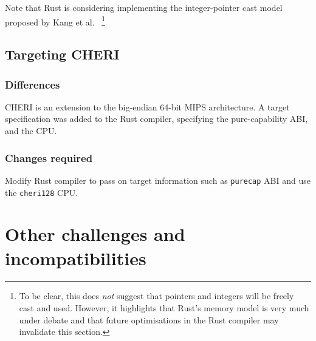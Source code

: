 \documentclass[dissertation.tex]{subfiles}
\begin{document}
Note that Rust is considering implementing the integer-pointer cast
model proposed by Kang et
al.~\cite{kang-intptrcast,rust-miri-intptrcast}
\footnote{To be clear, this does \emph{not} suggest that pointers and
integers will be freely cast and used. However, it highlights that
Rust's memory model is very much under debate and that future
optimisations in the Rust compiler may invalidate this section.}


\subsection{Targeting CHERI}

\subsubsection{Differences}
CHERI is an extension to the big-endian 64-bit MIPS architecture.
A target specification was added to the Rust compiler, specifying the
pure-capability ABI, and the CPU.

\subsubsection{Changes required}
Modify Rust compiler to pass on target information such as
\texttt{purecap} ABI and use the \texttt{cheri128} CPU.


\section{Other challenges and incompatibilities}
\end{document}

